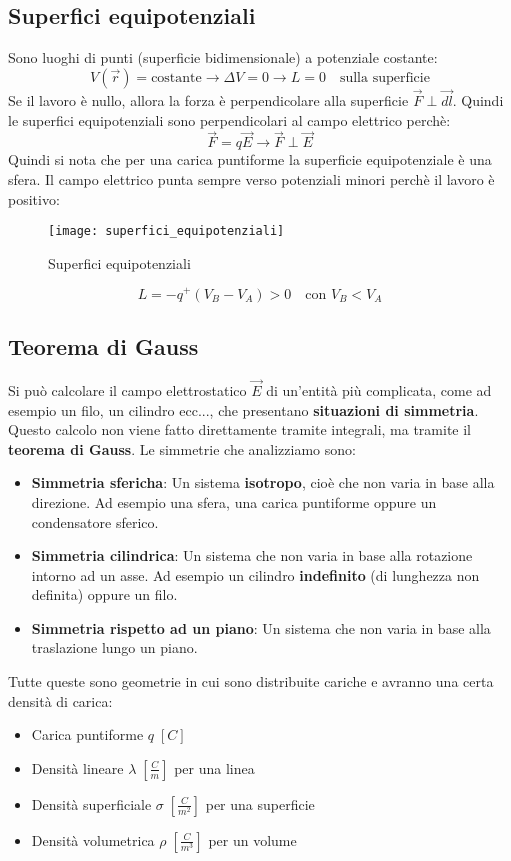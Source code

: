 \documentclass[a4paper]{article}
\begin{document}
\subsection{Superfici equipotenziali}
Sono luoghi di punti (superficie bidimensionale) a potenziale costante:
\[
  V(\vec{r}) = \text{costante} \to \Delta V = 0 \to L = 0 \quad \text{sulla superficie}
\] 
Se il lavoro è nullo, allora la forza è perpendicolare alla superficie \( \vec{F} \perp \vec{dl} \).
Quindi le superfici equipotenziali sono perpendicolari al campo elettrico perchè:
\[
  \vec{F} = q \vec{E} \to \vec{F} \perp \vec{E}
\] 
Quindi si nota che per una carica puntiforme la superficie equipotenziale è una sfera.
Il campo elettrico punta sempre verso potenziali minori perchè il lavoro è positivo:
\begin{figure}[H]
  \centering
  \texttt{[image: superfici\_equipotenziali]}
  \caption{Superfici equipotenziali}
\end{figure}
\[
  L = -q^+ \left( V_B - V_A \right) > 0 \quad \text{con } V_B < V_A
\] 

\subsection{Teorema di Gauss}
Si può calcolare il campo elettrostatico \( \vec{E} \) di un'entità più complicata, come
ad esempio un filo, un cilindro ecc..., che presentano \textbf{situazioni di simmetria}.
Questo calcolo non viene fatto direttamente tramite integrali, ma tramite il \textbf{teorema
di Gauss}. Le simmetrie che analizziamo sono:
\begin{itemize}
  \item \textbf{Simmetria sfericha}: Un sistema \textbf{isotropo}, cioè che non varia in
    base alla direzione. Ad esempio una sfera, una carica puntiforme oppure un
    condensatore sferico.

  \item \textbf{Simmetria cilindrica}: Un sistema che non varia in base alla rotazione 
    intorno ad un asse. Ad esempio un cilindro \textbf{indefinito} (di lunghezza non 
    definita) oppure un filo.

  \item \textbf{Simmetria rispetto ad un piano}: Un sistema che non varia in base alla 
    traslazione lungo un piano.
\end{itemize}
Tutte queste sono geometrie in cui sono distribuite cariche e avranno una certa densità
di carica:
\begin{itemize}
  \item Carica puntiforme \( q \; \left[ C \right] \)
  \item Densità lineare \( \lambda \; \left[ \frac{C}{m} \right] \) per una linea
  \item Densità superficiale \( \sigma \; \left[ \frac{C}{m^2} \right] \) per una superficie
  \item Densità volumetrica \( \rho \; \left[ \frac{C}{m^3} \right] \) per un volume
\end{itemize}
\end{document}

